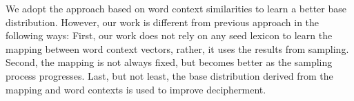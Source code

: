 We adopt the approach based on word context similarities to learn a better base distribution. However, our work is different from previous approach in the following ways: First, our work does not rely on any seed lexicon to learn the mapping between word context vectors, rather, it uses the results from sampling. Second, the mapping is not always fixed, but becomes better as the sampling process progresses. Last, but not least, the base distribution derived from the mapping and word contexts is used to improve decipherment.